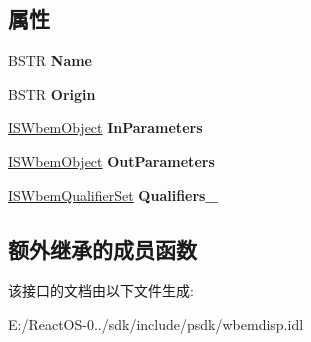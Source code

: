 \subsection*{属性}
\begin{DoxyCompactItemize}
\item 
\mbox{\label{interface_wbem_scripting_1_1_i_s_wbem_method_a895d685d265741924cb03a68e483fc46}} 
B\+S\+TR {\bfseries Name}
\item 
\mbox{\label{interface_wbem_scripting_1_1_i_s_wbem_method_a178d9750dac1500cc2064f07155d3b8e}} 
B\+S\+TR {\bfseries Origin}
\item 
\mbox{\label{interface_wbem_scripting_1_1_i_s_wbem_method_a6a624f5229c96c811d6d501ed1bef64b}} 
\hyperlink{interface_wbem_scripting_1_1_i_s_wbem_object}{I\+S\+Wbem\+Object} {\bfseries In\+Parameters}
\item 
\mbox{\label{interface_wbem_scripting_1_1_i_s_wbem_method_abfcf1bd2dd1acda88d08f0bf88b20c7f}} 
\hyperlink{interface_wbem_scripting_1_1_i_s_wbem_object}{I\+S\+Wbem\+Object} {\bfseries Out\+Parameters}
\item 
\mbox{\label{interface_wbem_scripting_1_1_i_s_wbem_method_a35536fcde597b7e6dbb445ec0fc6b9bf}} 
\hyperlink{interface_wbem_scripting_1_1_i_s_wbem_qualifier_set}{I\+S\+Wbem\+Qualifier\+Set} {\bfseries Qualifiers\+\_\+}
\end{DoxyCompactItemize}
\subsection*{额外继承的成员函数}


该接口的文档由以下文件生成\+:\begin{DoxyCompactItemize}
\item 
E\+:/\+React\+O\+S-\/0../sdk/include/psdk/wbemdisp.\+idl\end{DoxyCompactItemize}
